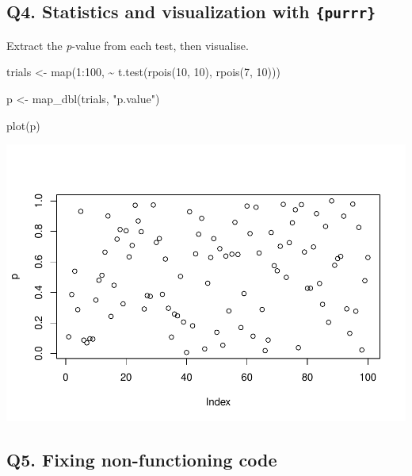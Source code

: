 \documentclass[
]{book}
\newenvironment{Shaded}{\begin{snugshade}}{\end{snugshade}}
\newcommand{\DecValTok}[1]{\textcolor[rgb]{0.00,0.00,0.81}{#1}}
\newcommand{\FunctionTok}[1]{\textcolor[rgb]{0.00,0.00,0.00}{#1}}
\newcommand{\NormalTok}[1]{#1}
\newcommand{\OtherTok}[1]{\textcolor[rgb]{0.56,0.35,0.01}{#1}}
\newcommand{\SpecialCharTok}[1]{\textcolor[rgb]{0.00,0.00,0.00}{#1}}
\newcommand{\StringTok}[1]{\textcolor[rgb]{0.31,0.60,0.02}{#1}}
\begin{document}
\hypertarget{q4.-statistics-and-visualization-with-purrr}{%
\subsection*{\texorpdfstring{Q4. Statistics and visualization with \texttt{\{purrr\}}}{Q4. Statistics and visualization with \{purrr\}}}\label{q4.-statistics-and-visualization-with-purrr}}

Extract the \emph{p}-value from each test, then visualise.

\begin{Shaded}
\begin{Highlighting}[]
\NormalTok{trials }\OtherTok{\textless{}{-}} \FunctionTok{map}\NormalTok{(}\DecValTok{1}\SpecialCharTok{:}\DecValTok{100}\NormalTok{, }\SpecialCharTok{\textasciitilde{}} \FunctionTok{t.test}\NormalTok{(}\FunctionTok{rpois}\NormalTok{(}\DecValTok{10}\NormalTok{, }\DecValTok{10}\NormalTok{), }\FunctionTok{rpois}\NormalTok{(}\DecValTok{7}\NormalTok{, }\DecValTok{10}\NormalTok{)))}

\NormalTok{p }\OtherTok{\textless{}{-}} \FunctionTok{map\_dbl}\NormalTok{(trials, }\StringTok{"p.value"}\NormalTok{)}

\FunctionTok{plot}\NormalTok{(p)}
\end{Highlighting}
\end{Shaded}

\includegraphics{Functionals_files/figure-latex/unnamed-chunk-7-1.pdf}

\hypertarget{q5.-fixing-non-functioning-code}{%
\subsection*{Q5. Fixing non-functioning code}\label{q5.-fixing-non-functioning-code}}
\end{document}
